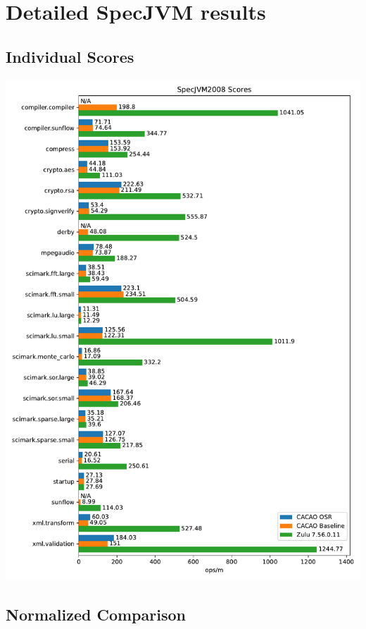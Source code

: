 \documentclass[draft,final]{vutinfth} %
\begin{document}
    \appendix


    \chapter{Detailed SpecJVM results}


    \section{Individual Scores}

    \includegraphics[width=\textwidth]{../evaluation/specjvm/plots/plot3}


    \section{Normalized Comparison}
\end{document}
